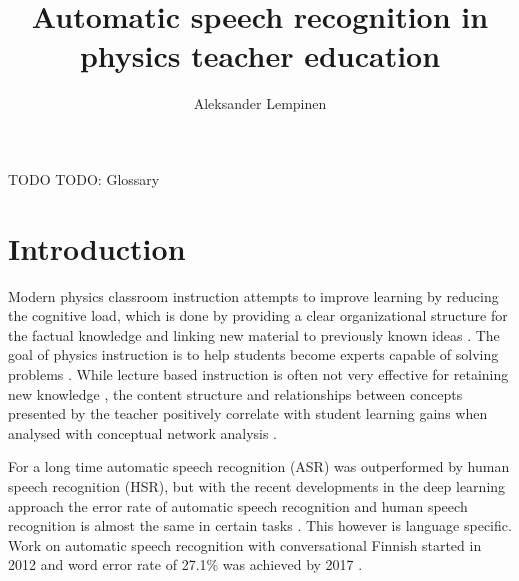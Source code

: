 \documentclass[utf8,english]{gradu3}
\begin{document}
\title{Automatic speech recognition in physics teacher education}

\author{Aleksander Lempinen}



\maketitle

\begin{thetermlist}
\item[TODO] TODO: Glossary
\end{thetermlist}

\mainmatter

\chapter{Introduction}
Modern physics classroom instruction attempts to improve learning by reducing the cognitive load, which is done by providing a clear organizational structure for the factual knowledge and linking new material to previously known ideas \parencite{wieman2005transforming}. The goal of physics instruction is to help students become experts capable of solving problems \parencite{fischer2014quality,wieman2005transforming}. While lecture based instruction is often not very effective for retaining new knowledge \parencite{wieman2005transforming}, the content structure and relationships between concepts presented by the teacher positively correlate with student learning gains when analysed with conceptual network analysis \parencite{fischer2014quality}. 

For a long time automatic speech recognition (ASR) was outperformed by human speech recognition (HSR), but with the recent developments in the deep learning approach the error rate of automatic speech recognition and human speech recognition is almost the same in certain tasks \parencite{spille2018comparing}. This however is language specific. Work on automatic speech recognition with conversational Finnish started in 2012 and word error rate of 27.1\% was achieved by 2017 \parencite{enarvi2018modeling}. 
\end{document}
